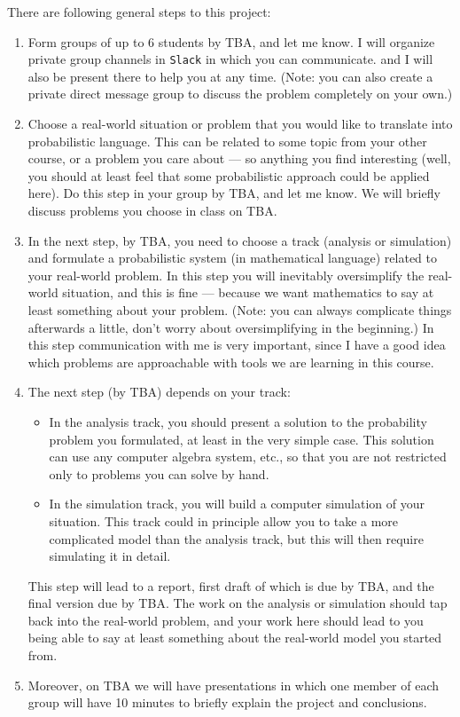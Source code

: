\documentclass[oneside,11pt]{amsart}
\begin{document}
There are following general steps to this project:
\begin{enumerate}[\bf{}1.]
	\item Form groups of up to 6 students by TBA, and let me know. 
	I will organize private group channels in \texttt{Slack} in which you can communicate.
	and I will also be present there to help you at any time.
	(Note: you can also create a private direct message group 
	to discuss the problem completely on your own.)
	\item Choose a real-world situation or problem that you would like to 
	translate into probabilistic language. This can be related
	to some topic from your other course, or a problem you care about --- so anything you find interesting
	(well, you should at least feel that some probabilistic approach could be applied here). 
	Do this step in your group by TBA, and let me know. We will briefly discuss 
	problems you choose in class on TBA.
	\item In the next step, by TBA, you need to choose a track (analysis or simulation)
	and formulate a probabilistic system (in mathematical language)
	related to your real-world problem. In this step you will inevitably 
	oversimplify the real-world situation, and this is fine --- because we want
	mathematics to say at least something about your problem. 
	(Note: you can always complicate things
	afterwards a little, don't worry about oversimplifying in the beginning.)
	In this step communication with me is very important, since I have a good idea
	which problems are approachable with tools we are learning in this course.
	\item The next step (by TBA) depends on your track:
	\begin{itemize}
		\item In the analysis track, you should present a solution to the probability problem you formulated, 
		at least in the very simple case. 
		This solution can use any computer algebra system, etc., so that 
		you are not restricted only to problems you can solve by hand.

		\item In the simulation track, you will build a computer simulation
		of your situation. This track could in principle allow you to 
		take a more complicated model
		than the analysis track, but this will then require simulating it in detail. 
	\end{itemize}
	This step will lead to a report,
	first draft of which is due by TBA, 
	and the
	final version due by TBA.
	The work on the analysis or simulation should tap back into the real-world problem, 
	and your work here should lead to you being able to say at least something about the real-world model
	you started from. 
	\item Moreover, on TBA we will have presentations in which one member of each group 
	will have 10 minutes to briefly explain the project and conclusions.
\end{enumerate}
\end{document}

